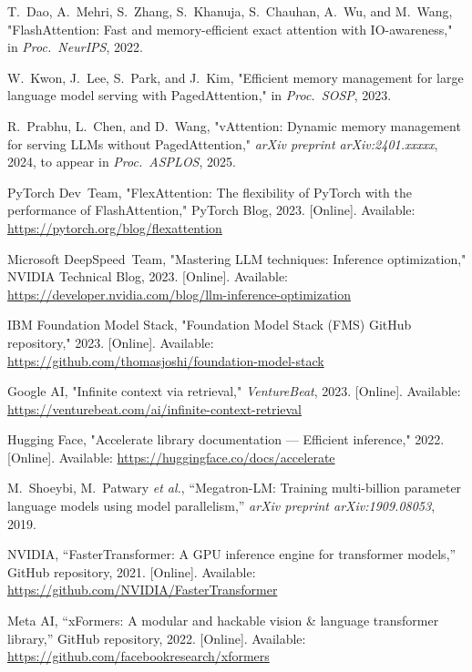 \documentclass[conference]{IEEEtran}
\begin{document}
\begin{thebibliography}{8}

T.~Dao, A.~Mehri, S.~Zhang, S.~Khanuja, S.~Chauhan, A.~Wu, and M.~Wang,
"FlashAttention: Fast and memory-efficient exact attention with IO-awareness,"
in \emph{Proc.\ NeurIPS}, 2022.

W.~Kwon, J.~Lee, S.~Park, and J.~Kim, "Efficient memory management for large language
model serving with PagedAttention," in \emph{Proc.\ SOSP}, 2023.

R.~Prabhu, L.~Chen, and D.~Wang, "vAttention: Dynamic memory management for serving
LLMs without PagedAttention," \emph{arXiv preprint arXiv:2401.xxxxx}, 2024,
to appear in \emph{Proc.\ ASPLOS}, 2025.

PyTorch Dev~Team, "FlexAttention: The flexibility of PyTorch with the performance of
FlashAttention," PyTorch Blog, 2023. [Online]. Available:
\url{https://pytorch.org/blog/flexattention}

Microsoft DeepSpeed~Team, "Mastering LLM techniques: Inference optimization,"
NVIDIA Technical Blog, 2023. [Online]. Available:
\url{https://developer.nvidia.com/blog/llm-inference-optimization}

IBM Foundation Model Stack, "Foundation Model Stack (FMS) GitHub repository," 2023.
[Online]. Available:
\url{https://github.com/thomasjoshi/foundation-model-stack}

Google AI, "Infinite context via retrieval," \emph{VentureBeat}, 2023. [Online]. Available:
\url{https://venturebeat.com/ai/infinite-context-retrieval}

Hugging Face, "Accelerate library documentation — Efficient inference," 2022. [Online].
Available: \url{https://huggingface.co/docs/accelerate}


M.~Shoeybi, M.~Patwary \emph{et al.}, ``Megatron-LM: Training multi-billion parameter language models using model parallelism,'' \emph{arXiv preprint arXiv:1909.08053}, 2019.

NVIDIA, ``FasterTransformer: A GPU inference engine for transformer models,'' GitHub repository, 2021. [Online]. Available: \url{https://github.com/NVIDIA/FasterTransformer}

Meta AI, ``xFormers: A modular and hackable vision \& language transformer library,'' GitHub repository, 2022. [Online]. Available: \url{https://github.com/facebookresearch/xformers}


\end{thebibliography}
\end{document}
